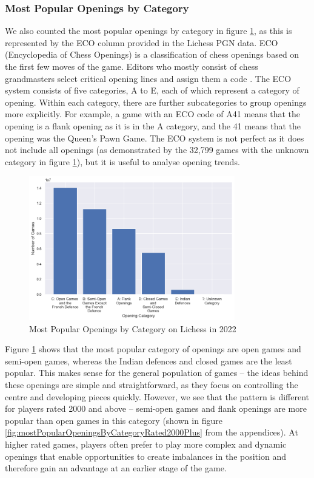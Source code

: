 \documentclass[a4paper, 11pt]{article}
\begin{document}
\subsubsection{Most Popular Openings by Category}

We also counted the most popular openings by category in figure \ref{fig:mostPopularOpeningsByCategory}, as this is represented by the ECO column provided in the Lichess PGN data. ECO (Encyclopedia of Chess Openings) is a classification of chess openings based on the first few moves of the game. Editors who mostly consist of chess grandmasters select critical opening lines and assign them a code \cite{matanovic1971classification}. The ECO system consists of five categories, A to E, each of which represent a category of opening. Within each category, there are further subcategories to group openings more explicitly. For example, a game with an ECO code of A41 means that the opening is a flank opening as it is in the A category, and the 41 means that the opening was the Queen's Pawn Game. The ECO system is not perfect as it does not include all openings (as demonstrated by the 32,799 games with the unknown category in figure \ref{fig:mostPopularOpeningsByCategory}), but it is useful to analyse opening trends.

\begin{figure}[H]
    \centering
    \caption{Most Popular Openings by Category on Lichess in 2022}
    \label{fig:mostPopularOpeningsByCategory}
    \includegraphics[width=0.8\textwidth]{Most Popular Openings by Category.png}
\end{figure}

Figure \ref{fig:mostPopularOpeningsByCategory} shows that the most popular category of openings are open games and semi-open games, whereas the Indian defences and closed games are the least popular. This makes sense for the general population of games -- the ideas behind these openings are simple and straightforward, as they focus on controlling the centre and developing pieces quickly. However, we see that the pattern is different for players rated 2000 and above -- semi-open games and flank openings are more popular than open games in this category (shown in figure \ref{fig:mostPopularOpeningsByCategoryRated2000Plus} from the appendices). At higher rated games, players often prefer to play more complex and dynamic openings that enable opportunities to create imbalances in the position and therefore gain an advantage at an earlier stage of the game.
\end{document}
